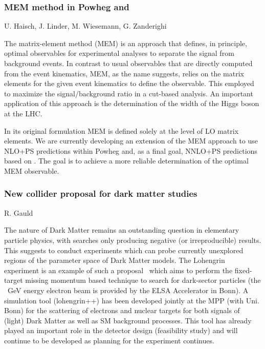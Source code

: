 \documentclass{FBR_Bericht_2025}
\begin{document}
\begin{refsection}
\subsubsection{MEM method in Powheg and \minnlo{}}
\begin{Namen}
U. Haisch, J. Linder, M. Wiesemann, G. Zanderighi
\end{Namen}
%
The matrix-element method (MEM) is an approach that defines, in principle, optimal observables
for experimental analyses to separate the signal from background events. In contrast to usual 
observables that are directly computed from the event kinematics, MEM, as the name suggests, 
relies on the matrix elements for the given event kinematics to define the observable. This employed
to maximize the signal/background ratio in a cut-based analysis. An important application of this
approach is the determination of the width of the Higgs boson at the LHC.

In its original formulation MEM is defined solely at the level of LO matrix elements. We are currently
developing an extension of the MEM approach to use NLO+PS predictions within Powheg and,
as a final goal, NNLO+PS predictions based on \minnlo{}. The goal is to achieve a more reliable
determination of the optimal MEM observable.
%
\subsubsection{New collider proposal for dark matter studies}
\begin{Namen}
R. Gauld
\end{Namen}
The nature of Dark Matter remains an outstanding question in elementary particle physics, with searches only producing negative (or irreproducible) results.
This suggests to conduct experiments which can probe currently unexplored regions of the parameter space of Dark Matter models.
The Lohengrin experiment is an example of such a proposal~\cite{Bechtle:2024atq} which aims to perform the fixed-target missing momentum based technique to search for dark-sector particles (the ~GeV energy electron beam is provided by the ELSA Accelerator in Bonn).
A simulation tool (lohengrin++) has been developed jointly at the MPP (with Uni. Bonn) for the scattering of electrons and nuclear targets for both signals of (light) Dark Matter as well as SM background processes. This tool has already played an important role in the detector design (feasibility study) and will continue to be developed as planning for the experiment continues. 



\end{refsection}
\end{document}
